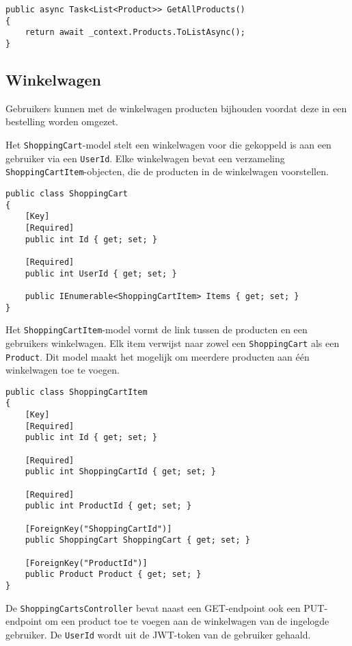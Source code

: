 \begin{lstlisting}[style=mystyleA, caption=ProductService.cs (fragment), label=lst:MonoProductService]
public async Task<List<Product>> GetAllProducts()
{
	return await _context.Products.ToListAsync();
}
\end{lstlisting}

\subsection{Winkelwagen}

Gebruikers kunnen met de winkelwagen producten bijhouden voordat deze in een bestelling worden omgezet.

\medskip
Het \texttt{ShoppingCart}-model stelt een winkelwagen voor die gekoppeld is aan een gebruiker via een \texttt{UserId}. Elke winkelwagen bevat een verzameling \texttt{ShoppingCartItem}-objecten, die de producten in de winkelwagen voorstellen.
\medskip

\begin{lstlisting}[style=mystyleA, caption=ShoppingCart.cs, label=lst:MonoShoppingCartModel]
public class ShoppingCart
{
	[Key]
	[Required]
	public int Id { get; set; }
	
	[Required]
	public int UserId { get; set; }
	
	public IEnumerable<ShoppingCartItem> Items { get; set; }
}
\end{lstlisting}

\medskip
Het \texttt{ShoppingCartItem}-model vormt de link tussen de producten en een gebruikers winkelwagen. Elk item verwijst naar zowel een \texttt{ShoppingCart} als een \texttt{Product}. Dit model maakt het mogelijk om meerdere producten aan één winkelwagen toe te voegen.
\medskip

\begin{lstlisting}[style=mystyleA, caption=ShoppingCartItem.cs, label=lst:MonoShoppingCartItemModel]
public class ShoppingCartItem
{
	[Key]
	[Required]
	public int Id { get; set; }
	
	[Required]
	public int ShoppingCartId { get; set; }
	
	[Required]
	public int ProductId { get; set; }
	
	[ForeignKey("ShoppingCartId")]
	public ShoppingCart ShoppingCart { get; set; }
	
	[ForeignKey("ProductId")]
	public Product Product { get; set; }
}
\end{lstlisting}

\medskip
De \texttt{ShoppingCartsController} bevat naast een GET-endpoint ook een PUT-endpoint om een product toe te voegen aan de winkelwagen van de ingelogde gebruiker. De \texttt{UserId} wordt uit de JWT-token van de gebruiker gehaald.
\medskip

